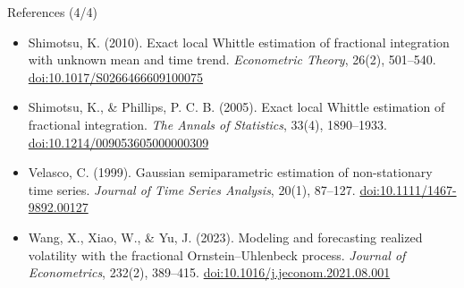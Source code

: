\begin{frame}{References (4/4)}
\begin{itemize}
    \item Shimotsu, K. (2010). Exact local Whittle estimation of fractional integration with unknown mean and time trend. \textit{Econometric Theory}, 26(2), 501--540. \href{https://doi.org/10.1017/S0266466609100075}{doi:10.1017/S0266466609100075}
    \item Shimotsu, K., \& Phillips, P. C. B. (2005). Exact local Whittle estimation of fractional integration. \textit{The Annals of Statistics}, 33(4), 1890--1933. \href{https://doi.org/10.1214/009053605000000309}{doi:10.1214/009053605000000309}
    \item Velasco, C. (1999). Gaussian semiparametric estimation of non-stationary time series. \textit{Journal of Time Series Analysis}, 20(1), 87--127. \href{https://doi.org/10.1111/1467-9892.00127}{doi:10.1111/1467-9892.00127}
    \item Wang, X., Xiao, W., \& Yu, J. (2023). Modeling and forecasting realized volatility with the fractional Ornstein--Uhlenbeck process. \textit{Journal of Econometrics}, 232(2), 389--415. \href{https://doi.org/10.1016/j.jeconom.2021.08.001}{doi:10.1016/j.jeconom.2021.08.001}
\end{itemize}
\end{frame}


